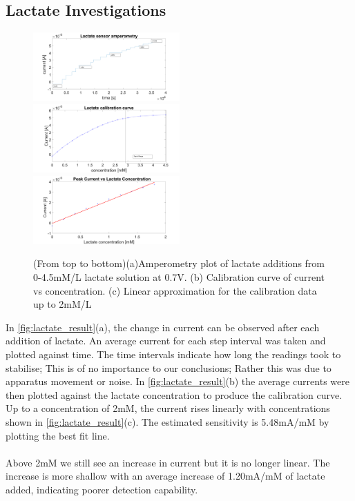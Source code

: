 \subsection{Lactate Investigations}
\begin{figure}[H]
    \centering
    \includegraphics[width=0.5\textwidth]{img/Lactate_fig_1.png}
    \includegraphics[width=0.5\textwidth]{img/Lactate_fig_2.png}
    \includegraphics[width=0.5\textwidth]{img/Lactate_fig_3.png}
    \caption{(From top to bottom)(a)Amperometry plot of lactate additions from 0-4.5mM/L lactate solution at 0.7V. (b) Calibration curve of current vs concentration. (c) Linear approximation for the calibration data up to 2mM/L}
    \label{fig:lactate_result}
\end{figure}
In \autoref{fig:lactate_result}(a), the change in current can be observed after each addition of lactate. An average current for each step interval was taken and plotted against time. The time intervals indicate how long the readings took to stabilise; This is of no importance to our conclusions; Rather this was due to apparatus movement or noise. In \autoref{fig:lactate_result}(b) the average currents were then plotted against the lactate concentration to produce the calibration curve. Up to a concentration of 2mM, the current rises linearly with concentrations shown in \autoref{fig:lactate_result}(c). The estimated sensitivity is 5.48mA/mM by plotting the best fit line. \\\\ 
Above 2mM we still see an increase in current but it is no longer linear. The increase is more shallow with an average increase of  1.20mA/mM of lactate added, indicating poorer detection capability. 
